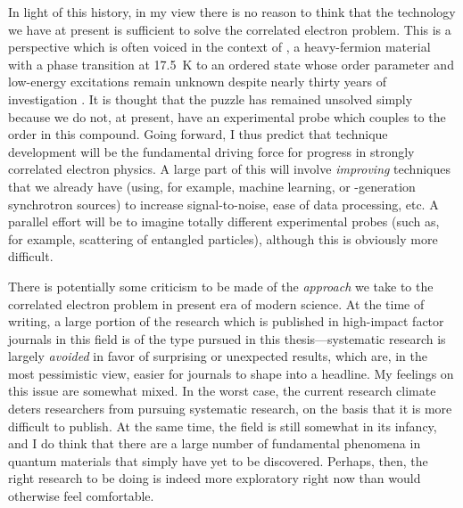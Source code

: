 In light of this history, in my view there is no reason to think that the technology we have at present is sufficient to solve the correlated electron problem.
This is a perspective which is often voiced in the context of , a heavy-fermion material with a phase transition at \qty{17.5}{K} to an ordered state whose order parameter and low-energy excitations remain unknown despite nearly thirty years of investigation \citep{palstra_superconducting_1985}.
It is thought \citep{alexandradinata_future_2022} that the puzzle has remained unsolved simply because we do not, at present, have an experimental probe which couples to the order in this compound.
Going forward, I thus predict that technique development will be the fundamental driving force for progress in strongly correlated electron physics.
A large part of this will involve \emph{improving} techniques that we already have (using, for example, machine learning, or -generation synchrotron sources) to increase signal-to-noise, ease of data processing, etc.
A parallel effort will be to imagine totally different experimental probes (such as, for example, scattering of entangled particles\citep{shen_unveiling_2020}), although this is obviously more difficult.

There is potentially some criticism to be made of the \emph{approach} we take to the correlated electron problem in present era of modern science.
At the time of writing, a large portion of the research which is published in high-impact factor journals in this field is of the type pursued in this thesis---systematic research is largely \emph{avoided} in favor of surprising or unexpected results, which are, in the most pessimistic view, easier for journals to shape into a headline.
My feelings on this issue are somewhat mixed.
In the worst case, the current research climate deters researchers from pursuing systematic research, on the basis that it is more difficult to publish.
At the same time, the field is still somewhat in its infancy, and I do think that there are a large number of fundamental phenomena in quantum materials that simply have yet to be discovered.
Perhaps, then, the right research to be doing is indeed more exploratory right now than would otherwise feel comfortable.

